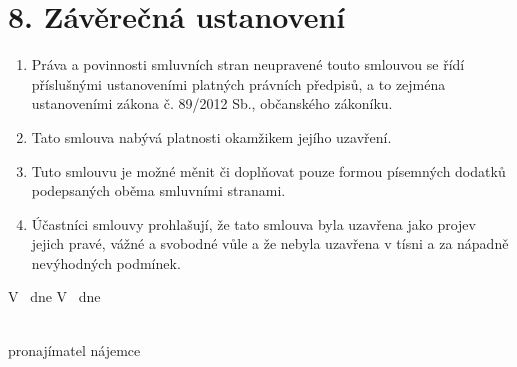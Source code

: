 \section*{8. Závěrečná ustanovení}

\begin{enumerate}[label=\arabic*.]
    \item Práva a povinnosti smluvních stran neupravené touto smlouvou se řídí příslušnými ustanoveními platných právních předpisů, a to zejména ustanoveními zákona č. 89/2012 Sb., občanského zákoníku.
    \item Tato smlouva nabývá platnosti okamžikem jejího uzavření.
    \item Tuto smlouvu je možné měnit či doplňovat pouze formou písemných dodatků podepsaných oběma smluvními stranami.
    \item Účastníci smlouvy prohlašují, že tato smlouva byla uzavřena jako projev jejich pravé, vážné a svobodné vůle a že nebyla uzavřena v tísni a za nápadně nevýhodných podmínek.
\end{enumerate}

\vspace{2cm}

V \ContractPlace \ dne \ContractDate \hfill V \underline{\hspace{3cm}} \ dne \underline{\hspace{3cm}}

\vspace{1.5cm}

\underline{\hspace{5cm}} \hfill \underline{\hspace{5cm}} \\
pronajímatel \hfill nájemce \\
